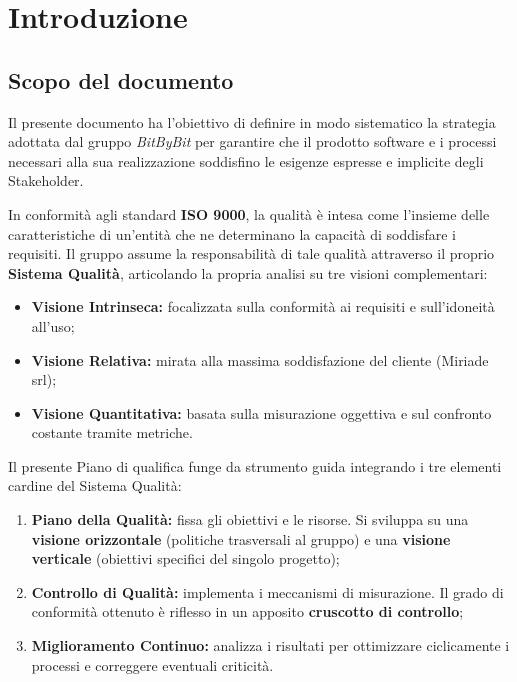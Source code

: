 \documentclass[a4paper,12pt]{article}
\begin{document}
\clearpage

\tableofcontents
\listoftables
\listoffigures
\thispagestyle{empty}

\clearpage


\section{Introduzione} \label{sec:introduzione}
\subsection{Scopo del documento} \label{sec:scopo_documento}
Il presente documento ha l'obiettivo di definire in modo sistematico la strategia adottata dal gruppo \textit{BitByBit} per garantire che il prodotto software e i processi necessari alla sua realizzazione soddisfino le esigenze espresse e implicite degli Stakeholder.

In conformità agli standard \textbf{ISO 9000}, la qualità è intesa come l'insieme delle caratteristiche di un'entità che ne determinano la capacità di soddisfare i requisiti. Il gruppo assume la responsabilità di tale qualità attraverso il proprio \textbf{Sistema Qualità}, articolando la propria analisi su tre visioni complementari:
\begin{itemize}
    \item \textbf{Visione Intrinseca:} focalizzata sulla conformità ai requisiti e sull'idoneità all'uso;
    \item \textbf{Visione Relativa:} mirata alla massima soddisfazione del cliente (Miriade srl);
    \item \textbf{Visione Quantitativa:} basata sulla misurazione oggettiva e sul confronto costante tramite metriche.
\end{itemize}

Il presente Piano di qualifica funge da strumento guida integrando i tre elementi cardine del Sistema Qualità:
\begin{enumerate}
    \item \textbf{Piano della Qualità:} fissa gli obiettivi e le risorse. Si sviluppa su una \textbf{visione orizzontale} (politiche trasversali al gruppo) e una \textbf{visione verticale} (obiettivi specifici del singolo progetto);
    \item \textbf{Controllo di Qualità:} implementa i meccanismi di misurazione. Il grado di conformità ottenuto è riflesso in un apposito \textbf{cruscotto di controllo};
    \item \textbf{Miglioramento Continuo:} analizza i risultati per ottimizzare ciclicamente i processi e correggere eventuali criticità.
\end{enumerate}
\end{document}

